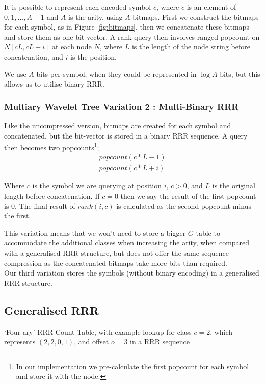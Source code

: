 It is possible to represent each encoded symbol $c$, where $c$ is an element of
${ 0, 1,..., A - 1}$ and $A$ is the arity, using $A$ bitmaps. First we construct
the bitmaps for each symbol, as in Figure \ref{fig:bitmaps}, then we concatenate these bitmaps and store them as one 
bit-vector. A rank query then involves ranged popcount on $N[c L, c L + i]$ at 
each node $N$, where $L$ is the length of the node string before concatenation, 
and $i$ is the position.

We use $A$ bits per symbol, when they could be represented in $\log A$ bits, but
this allows us to utilise binary RRR.

\subsubsection{Multiary Wavelet Tree Variation 2 : Multi-Binary RRR}
Like the uncompressed version, bitmaps are created for each symbol and 
concatenated, but the bit-vector is stored in a binary RRR sequence. A query 
then becomes two popcounts\footnote{In our implementation we pre-calculate the 
first popcount for each symbol and store it with the node.};
	\begin{align}
	popcount(c * L - 1) \\
	popcount(c * L + i)
	\end{align}

Where $c$ is the symbol we are querying at position $i$,
$c > 0$, and $L$ is 
the original length before concatenation. If $c = 0$ then we say the result of 
the first popcount is $0$. The final result of $rank(i, c)$ is calculated as 
the second popcount minus the first.

This variation means that we won't need to store a bigger $G$ table to 
accommodate the additional classes when increasing the arity, when compared with
a generalised RRR structure, but does not offer the same sequence compression as
the concatenated bitmaps take more bits than required.\\

Our third variation stores the symbols (without binary encoding) in a 
generalised RRR structure.

\subsection{Generalised RRR}

	{`Four-ary' RRR Count Table, with example lookup for class $c = 2$, 
	which represents $(2, 2, 0, 1)$, and offset $o = 3$ in a RRR
	sequence}
	

